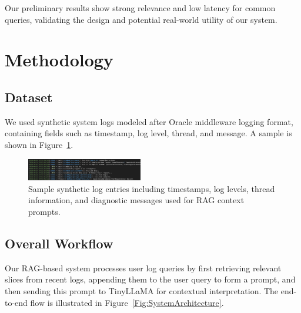 \documentclass[conference]{IEEEtran}
\begin{document}
Our preliminary results show strong relevance and low latency for common queries, validating the design and potential real-world utility of our system.

\section{Methodology}
\subsection{Dataset}

We used synthetic system logs modeled after Oracle middleware logging format, containing fields such as timestamp, log level, thread, and message. A sample is shown in Figure~\ref{Fig:LogSample}.

\begin{figure}[!ht]

\centering

\includegraphics[width=0.45\textwidth]{figures/logs-sample.png}

\caption{Sample synthetic log entries including timestamps, log levels, thread information, and diagnostic messages used for RAG context prompts.}

\label{Fig:LogSample}

\end{figure}

\subsection{Overall Workflow}

Our RAG-based system processes user log queries by first retrieving relevant slices from recent logs, appending them to the user query to form a prompt, and then sending this prompt to TinyLLaMA for contextual interpretation. The end-to-end flow is illustrated in Figure~\ref{Fig:SystemArchitecture}.
\end{document}
